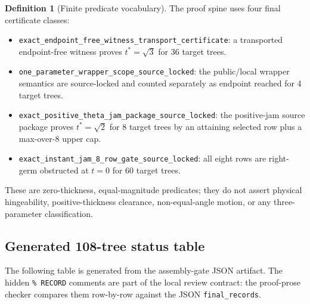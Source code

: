 \documentclass[11pt,a4paper]{article}
\theoremstyle{definition}
\newtheorem{definition}[theorem]{Definition}
\theoremstyle{remark}
\begin{document}
\begin{definition}[Finite predicate vocabulary]
The proof spine uses four final certificate classes:
\begin{itemize}
\item \texttt{exact\_endpoint\_free\_witness\_transport\_certificate}: a transported endpoint-free witness proves \(t^*=\sqrt{3}\) for 36 target trees.
\item \texttt{one\_parameter\_wrapper\_scope\_source\_locked}: the public/local wrapper semantics are source-locked and counted separately as endpoint reached for 4 target trees.
\item \texttt{exact\_positive\_theta\_jam\_package\_source\_locked}: the positive-jam source package proves \(t^*=\sqrt{2}\) for 8 target trees by an attaining selected row plus a max-over-8 upper cap.
\item \texttt{exact\_instant\_jam\_8\_row\_gate\_source\_locked}: all eight rows are right-germ obstructed at \(t=0\) for 60 target trees.
\end{itemize}
These are zero-thickness, equal-magnitude predicates; they do not assert physical hingeability, positive-thickness clearance, non-equal-angle motion, or any three-parameter classification.
\end{definition}

\subsection{Generated 108-tree status table}

The following table is generated from the assembly-gate JSON artifact.  The hidden \texttt{\% RECORD} comments are part of the local review contract: the proof-prose checker compares them row-by-row against the JSON \texttt{final\_records}.
\end{document}
